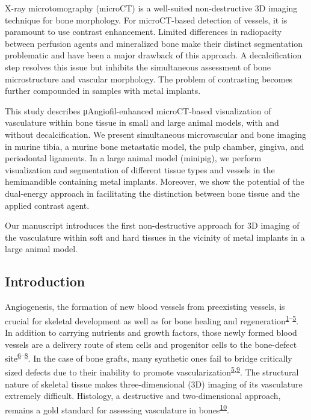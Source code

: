 X-ray microtomography (microCT) is a well-suited non-destructive 3D imaging technique for bone morphology.
For microCT-based detection of vessels, it is paramount to use contrast enhancement.
Limited differences in radiopacity between perfusion agents and mineralized bone make their distinct segmentation problematic and have been a major drawback of this approach.
A decalcification step resolves this issue but inhibits the simultaneous assessment of bone microstructure and vascular morphology.
The problem of contrasting becomes further compounded in samples with metal implants.

This study describes μAngiofil-enhanced microCT-based visualization of vasculature within bone tissue in small and large animal models, with and without decalcification.
We present simultaneous microvascular and bone imaging in murine tibia, a murine bone metastatic model, the pulp chamber, gingiva, and periodontal ligaments.
In a large animal model (minipig), we perform visualization and segmentation of different tissue types and vessels in the hemimandible containing metal implants.
Moreover, we show the potential of the dual-energy approach in facilitating the distinction between bone tissue and the applied contrast agent.

Our manuscript introduces the first non-destructive approach for 3D imaging of the vasculature within soft and hard tissues in the vicinity of metal implants in a large animal model.

\hypertarget{introduction}{%
\subsection{Introduction}\label{introduction}}

Angiogenesis, the formation of new blood vessels from preexisting vessels, is crucial for skeletal development as well as for bone healing and regeneration\textsuperscript{\protect\hyperlink{ref-zXoIXG3G}{1}--\protect\hyperlink{ref-Vu36g0cK}{5}}.
In addition to carrying nutrients and growth factors, those newly formed blood vessels are a delivery route of stem cells and progenitor cells to the bone-defect site\textsuperscript{\protect\hyperlink{ref-dBkW39I8}{6}--\protect\hyperlink{ref-5mgeUNd6}{8}}.
In the case of bone grafts, many synthetic ones fail to bridge critically sized defects due to their inability to promote vascularization\textsuperscript{\protect\hyperlink{ref-Vu36g0cK}{5},\protect\hyperlink{ref-33Vq8bQx}{9}}.
The structural nature of skeletal tissue makes three-dimensional (3D) imaging of its vasculature extremely difficult.
Histology, a destructive and two-dimensional approach, remains a gold standard for assessing vasculature in bones\textsuperscript{\protect\hyperlink{ref-117R9ULnv}{10}}.

